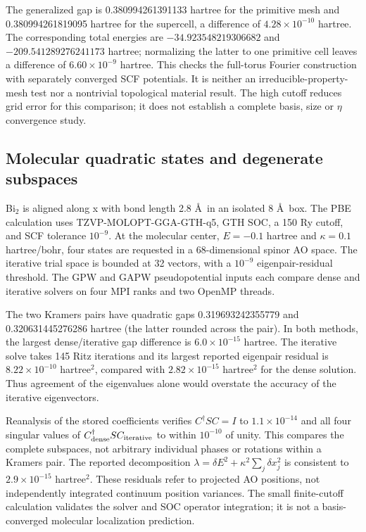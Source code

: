 \documentclass[11pt]{article}
\begin{document}
The generalized gap is 0.380994261391133 hartree for the primitive
mesh and 0.380994261819095 hartree for the supercell, a difference
of $4.28\times10^{-10}$ hartree.
The corresponding total energies are
$-34.923548219306682$ and $-209.541289276241173$ hartree;
normalizing the latter to one primitive cell leaves a difference
of $6.60\times10^{-9}$ hartree. This checks the full-torus
Fourier construction with separately converged SCF potentials.
It is neither an irreducible-property-mesh test nor a nontrivial
topological material result. The high cutoff reduces grid error
for this comparison; it does not establish a complete basis,
size or $\eta$ convergence study.

\subsection{Molecular quadratic states and degenerate subspaces}
Bi$_2$ is aligned along x with bond length 2.8 \AA\ in an isolated
8 \AA\ box. The PBE calculation uses TZVP-MOLOPT-GGA-GTH-q5,
GTH SOC, a 150 Ry cutoff, and SCF tolerance $10^{-9}$.
At the molecular center, $E=-0.1$ hartree and
$\kappa=0.1$ hartree/bohr, four states are requested in a
68-dimensional spinor AO space. The iterative trial space is
bounded at 32 vectors, with a $10^{-9}$ eigenpair-residual
threshold. The GPW and GAPW pseudopotential inputs each compare
dense and iterative solvers on four MPI ranks and two OpenMP threads.

The two Kramers pairs have quadratic gaps 0.319693242355779
and 0.320631445276286 hartree (the latter rounded across the pair).
In both methods, the largest dense/iterative gap difference is
$6.0\times10^{-15}$ hartree. The iterative solve takes 145 Ritz
iterations and its largest reported eigenpair residual is
$8.22\times10^{-10}$ hartree$^2$, compared with
$2.82\times10^{-15}$ hartree$^2$ for the dense solution.
Thus agreement of the eigenvalues alone would overstate the
accuracy of the iterative eigenvectors.

Reanalysis of the stored coefficients verifies $C^\dagger SC=I$
to $1.1\times10^{-14}$ and all four singular values of
$C_{\rm dense}^\dagger S C_{\rm iterative}$ to within
$10^{-10}$ of unity. This compares the complete subspaces,
not arbitrary individual phases or rotations within a Kramers pair.
The reported decomposition
$\lambda=\delta E^2+\kappa^2\sum_j\delta x_j^2$ is consistent
to $2.9\times10^{-15}$ hartree$^2$.
These residuals refer to projected AO positions, not independently
integrated continuum position variances. The small finite-cutoff
calculation validates the solver and SOC operator integration;
it is not a basis-converged molecular localization prediction.
\end{document}
